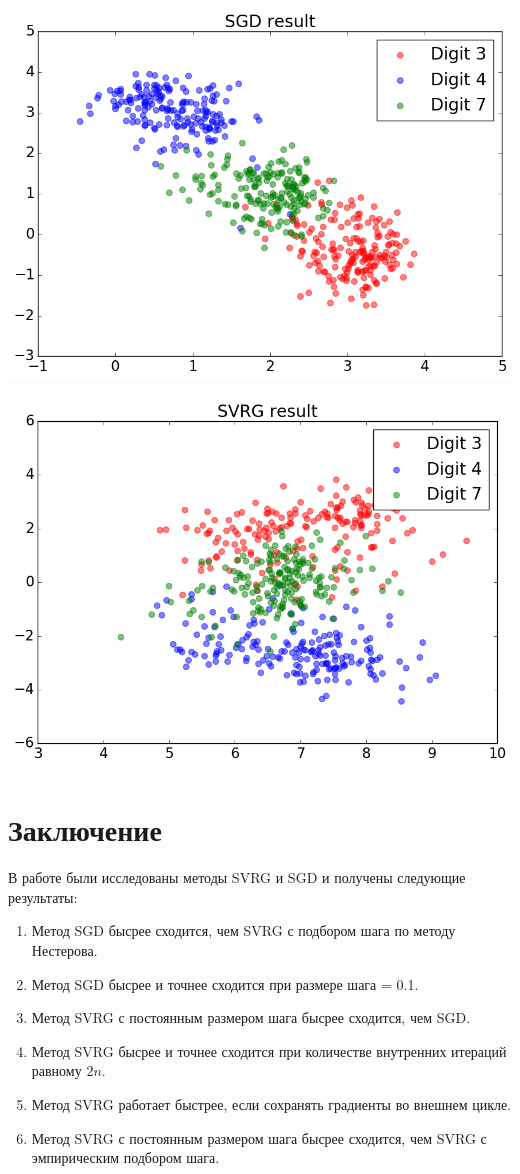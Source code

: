 \documentclass[12pt, a4paper]{article}
\begin{document}
    \begin{center}\includegraphics[width=\picwidth]{proj_sgd.png}\end{center}
    \begin{center}\includegraphics[width=\picwidth]{proj_svrg.png}\end{center}

    \section{Заключение}
    В работе были исследованы методы SVRG и SGD и получены следующие результаты:
    \begin{enumerate}
        \item Метод SGD бысрее сходится, чем SVRG с подбором шага по методу Нестерова.
        \item Метод SGD бысрее и точнее сходится при размере шага = 0.1.
        \item Метод SVRG с постоянным размером шага бысрее сходится, чем SGD.
        \item Метод SVRG бысрее и точнее сходится при количестве внутренних итераций равному $2n$.
        \item Метод SVRG работает быстрее, если сохранять градиенты во внешнем цикле.
        \item Метод SVRG с постоянным размером шага бысрее сходится, чем SVRG с эмпирическим подбором шага.
    \end{enumerate}
\end{document}
